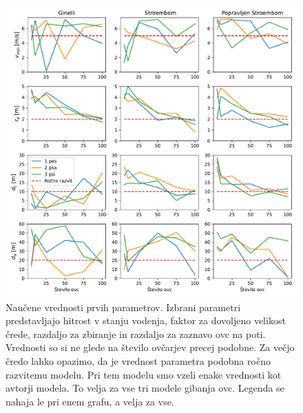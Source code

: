 \begin{figure}[H]  %
	\centering
	\includegraphics[width=\textwidth]{../poglavja/grafi/geni-1-4.pdf}
	\caption[Naučene vrednosti prvih parametrov]{Naučene vrednosti prvih parametrov. Izbrani parametri predstavljajo hitrost v stanju vodenja, faktor za dovoljeno velikost črede, razdaljo za zbiranje in razdaljo za zaznavo ovc na poti. Vrednosti so si ne glede na število ovčarjev precej podobne. Za večjo čredo lahko opazimo, da je vrednost parametra podobna ročno razvitemu modelu. Pri tem modelu smo vzeli enake vrednosti kot avtorji modela. To velja za vse tri modele gibanja ovc. Legenda se nahaja le pri enem grafu, a velja za vse.} %
	\label{fig:gen1-4}
\end{figure}


